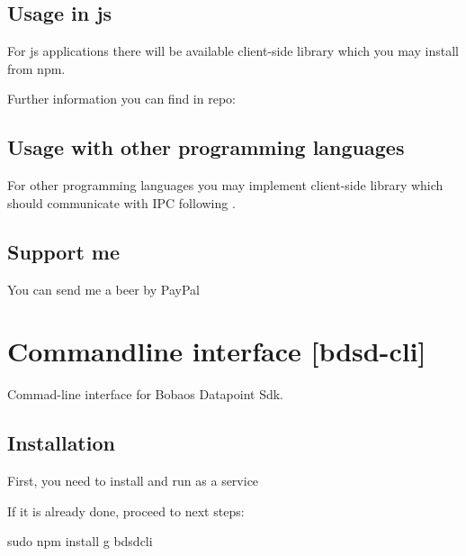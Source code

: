 \documentclass[letterpaper,10pt,english]{sphinxmanual}
\begin{document}
\section{Usage in js}
\label{\detokenize{bdsd.sock:usage-in-js}}\label{\detokenize{bdsd.sock:usage-in-js}}
For js applications there will be available client-side library which you may install from npm.

Further information you can find in repo: 


\section{Usage with other programming languages}
\label{\detokenize{bdsd.sock:usage-with-other-programming-languages}}\label{\detokenize{bdsd.sock:usage-with-other-programming-languages}}
For other programming languages you may implement client-side library which should communicate with IPC following .


\section{Support me}
\label{\detokenize{bdsd.sock:support-me}}\label{\detokenize{bdsd.sock:support-me}}
You can send me a beer by PayPal



\chapter{Commandline interface {[}bdsd-cli{]}}
\label{\detokenize{bdsd-cli:commandline-interface-bdsd-cli}}\label{\detokenize{bdsd-cli:commandline-interface-bdsd-cli}}\label{\detokenize{bdsd-cli::doc}}
Commad-line interface for Bobaos Datapoint Sdk.


\section{Installation}
\label{\detokenize{bdsd-cli:installation}}\label{\detokenize{bdsd-cli:installation}}
First, you need to install and run as a service 

If it is already done, proceed to next steps:

%
\begin{sphinxVerbatim}[commandchars=\\\{\}]
\PYGZdl{} sudo npm install \PYGZhy{}g bdsd\PYGZhy{}cli
\end{sphinxVerbatim}
\end{document}
